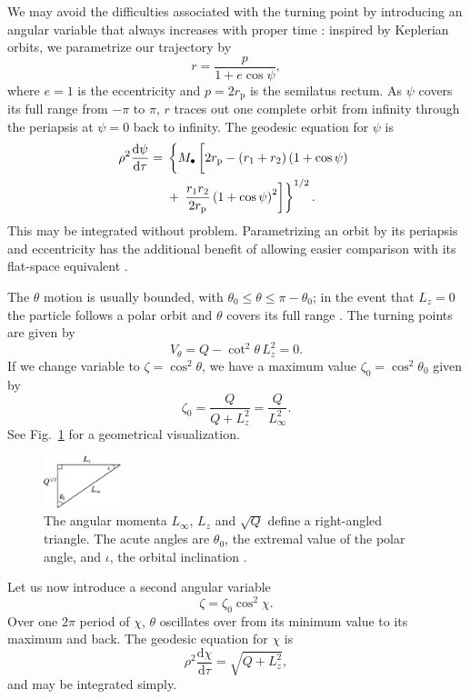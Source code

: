 \documentclass[useAMS,usedcolumn,usegraphicx,usenatbib]{mn2e}
\newcommand{\figref}[1]{Fig.~\ref{fig:#1}}
\newcommand{\sub}[1]{\ensuremath{_\mathrm{#1}}}
\newcommand{\dd}{\ensuremath{\mathrm{d}}}
\newcommand{\diff}[2]{\ensuremath{\frac{\dd {#1}}{\dd {#2}}}}
\begin{document}
We may avoid the difficulties associated with the turning point by introducing an angular variable that always increases with proper time \citep{Drasco2004}: inspired by Keplerian orbits, we parametrize our trajectory by
\begin{equation}
r = \frac{p}{1+e\cos\psi},
\end{equation}
where $e = 1$ is the eccentricity and $p = 2r\sub{p}$ is the semilatus rectum. As $\psi$ covers its full range from $-\pi$ to $\pi$, $r$ traces out one complete orbit from infinity through the periapsis at $\psi = 0$ back to infinity. The geodesic equation for $\psi$ is
\begin{align}
\rho^2 \diff{\psi}{\tau} = {} & \left\{M_\bullet\left[2r\sub{p} - \left(r_1 + r_2\right)\left(1 + \cos\psi\right) \vphantom{\frac{r_1 r_2}{2r\sub{p}}} \right.\right. \nonumber \\*
 {} & + \left.\left. \frac{r_1 r_2}{2r\sub{p}}\left(1 + \cos\psi\right)^2\right]\right\}^{1/2}.
\end{align}
This may be integrated without problem. Parametrizing an orbit by its periapsis and eccentricity has the additional benefit of allowing easier comparison with its flat-space equivalent \citep*{Gair2005}.

The $\theta$ motion is usually bounded, with $\theta_0 \leq \theta \leq \pi - \theta_0$; in the event that $L_z = 0$ the particle follows a polar orbit and $\theta$ covers its full range \citep{Wilkins1972}. The turning points are given by
\begin{equation}
V_\theta = Q - \cot^2\theta\, L_z^2 = 0.
\end{equation}
If we change variable to $\zeta = \cos^2\theta$, we have a maximum value $\zeta_0 = \cos^2\theta_0$ given by
\begin{equation}
\zeta_0 = \frac{Q}{Q+L_z^2} = \frac{Q}{L_\infty^2}.
\label{eq:theta_0}
\end{equation}
See \figref{L_triangle} for a geometrical visualization.
\begin{figure}
\begin{center}
\includegraphics[width=0.2\textwidth]{Triangle.eps}
    \caption{The angular momenta $L_\infty$, $L_z$ and $\sqrt{Q}$ define a right-angled triangle. The acute angles are $\theta_0$, the extremal value of the polar angle, and $\iota$, the orbital inclination \citep*{Glampedakis2002}.}
   \label{fig:L_triangle}
\end{center}
\end{figure}
Let us now introduce a second angular variable \citep{Drasco2004}
\begin{equation}
\zeta = \zeta_0\cos^2\chi.
\end{equation}
Over one $2\pi$ period of $\chi$, $\theta$ oscillates over from its minimum value to its maximum and back. The geodesic equation for $\chi$ is
\begin{equation}
\rho^2\diff{\chi}{\tau} = \sqrt{Q + L_z^2},
\end{equation}
and may be integrated simply.
\end{document}
